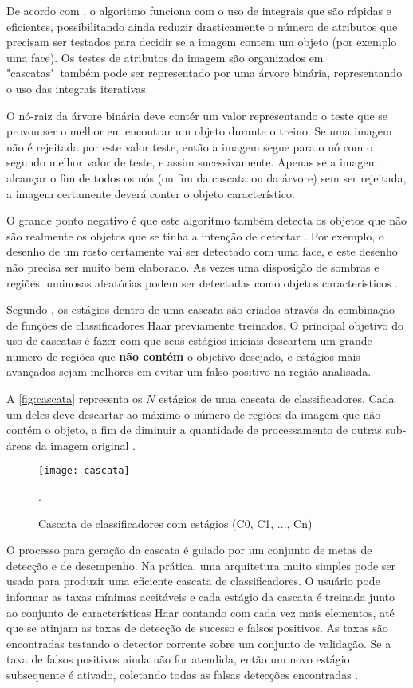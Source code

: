 De acordo com , o algoritmo funciona com o uso de integrais que são rápidas e eficientes, possibilitando ainda reduzir drasticamente o número de atributos que precisam ser testados para decidir se a imagem contem um objeto (por exemplo uma face). Os testes de atributos da imagem são organizados em "cascatas"\ também pode ser representado por uma árvore binária, representando o uso das integrais iterativas.

O nó-raiz da árvore binária deve contér um valor representando o teste que se provou ser o melhor em encontrar um objeto durante o treino. Se uma imagem não é rejeitada por este valor teste, então a imagem segue para o nó com o segundo melhor valor de teste, e assim sucessivamente. Apenas se a imagem alcançar o fim de todos os nós (ou fim da cascata ou da árvore) sem ser rejeitada, a imagem certamente deverá conter o objeto característico.

O grande ponto negativo é que este algoritmo também detecta os objetos que não são realmente os objetos que se tinha a intenção de detectar \cite{drmathew_java_programming}. Por exemplo, o desenho de um rosto certamente vai ser detectado com uma face, e este desenho não precisa ser muito bem elaborado. As vezes uma disposição de sombras e regiões luminosas aleatórias podem ser detectadas como objetos característicos .

Segundo , os estágios dentro de uma cascata são criados através da combinação de funções de classificadores Haar previamente treinados. O principal objetivo do uso de cascatas é fazer com que seus estágios iniciais descartem um grande numero de regiões que \textbf{não contém} o objetivo desejado, e estágios mais avançados sejam melhores em evitar um falso positivo na região analisada. 

A \autoref{fig:cascata} representa os $N$ estágios de uma cascata de classificadores. Cada um deles deve descartar ao máximo o número de regiões da imagem que não contém o objeto, a fim de diminuir a quantidade de processamento de outras sub-áreas da imagem original \cite{gustavo_cascata}.

 \begin{figure}[h]
	\centering
	\texttt{[image: cascata]}
	\caption{Cascata de classificadores com estágios (C0, C1, ..., Cn)}.
	\label{fig:cascata}
\end{figure}

O processo para geração da cascata é guiado por um conjunto de metas de detecção e de desempenho. Na prática, uma arquitetura muito simples pode ser usada para produzir uma eficiente cascata de classificadores. O usuário pode informar as taxas mínimas aceitáveis e cada estágio da cascata é treinada junto ao conjunto de características Haar contando com cada vez mais elementos, até que se atinjam as taxas de detecção de sucesso e falsos positivos. As taxas são encontradas testando o detector corrente sobre um conjunto de validação. Se a taxa de falsos positivos ainda não for atendida, então um novo estágio subsequente é ativado, coletando todas as falsas detecções encontradas \cite{gustavo_cascata}.

